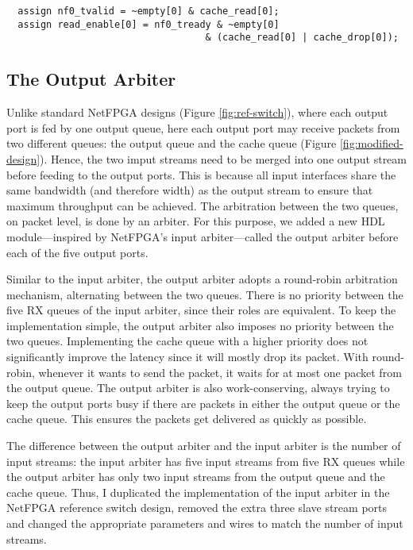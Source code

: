 {\renewcommand{\baselinestretch}{0.8}\small
	\begin{verbatim}
  assign nf0_tvalid = ~empty[0] & cache_read[0];
  assign read_enable[0] = nf0_tready & ~empty[0]
                                   & (cache_read[0] | cache_drop[0]);
	\end{verbatim}
}

	\subsection{The Output Arbiter}
Unlike standard NetFPGA designs (Figure \ref{fig:ref-switch}), where each output port is fed by one output queue, here each output port may receive packets from two different queues: the output queue and the cache queue (Figure \ref{fig:modified-design}). Hence, the two imput streams need to be merged into one output stream before feeding to the output ports. This is because all input interfaces share the same bandwidth (and therefore width) as the output stream to ensure that maximum throughput can be achieved. The arbitration between the two queues, on packet level, is done by an arbiter. For this purpose, we added a new HDL module---inspired by NetFPGA's input arbiter---called the output arbiter before each of the five output ports.

Similar to the input arbiter, the output arbiter adopts a round-robin arbitration mechanism, alternating between the two queues. There is no priority between the five RX queues of the input arbiter, since their roles are equivalent. To keep the implementation simple, the output arbiter also imposes no priority between the two queues. Implementing the cache queue with a higher priority does not significantly improve the latency since it will mostly drop its packet. With round-robin, whenever it wants to send the packet, it waits for at most one packet from the output queue. The output arbiter is also work-conserving, always trying to keep the output ports busy if there are packets in either the output queue or the cache queue. This ensures the packets get delivered as quickly as possible.

The difference between the output arbiter and the input arbiter is the number of input streams: the input arbiter has five input streams from five RX queues while the output arbiter has only two input streams from the output queue and the cache queue. Thus, I duplicated the implementation of the input arbiter in the NetFPGA reference switch design, removed the extra three slave stream ports and changed the appropriate parameters and wires to match the number of input streams.

